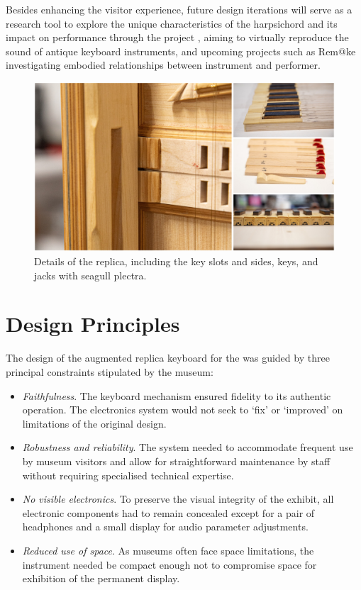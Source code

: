 Besides enhancing the visitor experience, future design iterations will serve as a research tool to explore the unique characteristics of the harpsichord and its impact on performance through the  project , aiming to virtually reproduce the sound of antique keyboard instruments, and upcoming projects such as Rem@ke \cite{remake1} investigating embodied relationships between instrument and performer.

\begin{figure}
\centering
\includegraphics[width=0.8\linewidth]{src/images/details.jpg}
\caption{Details of the replica, including the key slots and sides, keys, and jacks with seagull plectra.}
\label{fig:details}
\end{figure}

\section{Design Principles}\label{design}

The design of the augmented replica keyboard for the  was guided by three principal constraints stipulated by the museum:

\begin{itemize}
    \item \emph{Faithfulness}. The keyboard mechanism ensured fidelity to its authentic operation. The electronics system would not seek to `fix' or `improved' on limitations of the original design.     
    \item \emph{Robustness and reliability}. The system needed to accommodate frequent use by museum visitors and allow for straightforward maintenance by staff without requiring specialised technical expertise.
    \item \emph{No visible electronics}. To preserve the visual integrity of the exhibit, all electronic components had to remain concealed except for a pair of headphones and a small display for audio parameter adjustments.
    \item \emph{Reduced use of space}. As museums often face space limitations, the instrument needed be compact enough not to compromise space for exhibition of the permanent display. 
\end{itemize}

